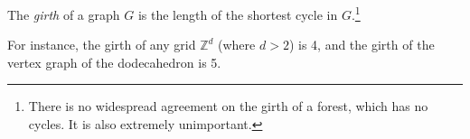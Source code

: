 \documentclass[12pt]{article}
\newcommand{\Ints}{\mathbb{Z}}
\begin{document}
The \emph{girth} of a graph $G$ is the length of the shortest cycle in $G$.\footnote{There is no widespread agreement on the girth of a forest, which has  no cycles.  It is also extremely unimportant.}

For instance, the girth of any grid $\Ints^d$ (where $d>2$) is 4, and the girth of the vertex graph of the dodecahedron is 5.
\end{document}
